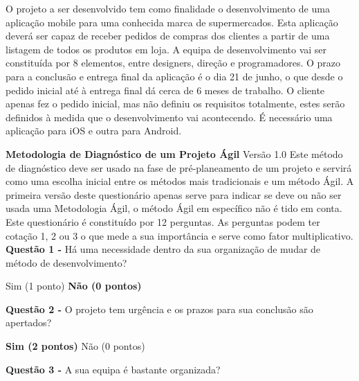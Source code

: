 O projeto a ser desenvolvido tem como finalidade o desenvolvimento de uma aplicação mobile para uma conhecida marca de supermercados. Esta aplicação deverá ser capaz de receber pedidos de compras dos clientes a partir de uma listagem de todos os produtos em loja. A  equipa de desenvolvimento vai ser constituída por 8 elementos, entre designers, direção e programadores. O prazo para a conclusão e entrega final da aplicação é o dia 21 de junho, o que desde o pedido inicial até à entrega final dá cerca de 6 meses de trabalho. O cliente apenas fez o pedido inicial, mas não definiu os requisitos totalmente, estes serão definidos à medida que o desenvolvimento vai acontecendo. É necessário uma aplicação para iOS e outra para Android.

\begin{framed}
\noindent\textbf{Metodologia de Diagnóstico de um Projeto Ágil}
\qquad
Versão 1.0
\vspace{2mm}
\newline Este método de diagnóstico deve ser usado na fase de pré-planeamento de um projeto e servirá como uma escolha inicial entre os métodos mais tradicionais e um método Ágil. A primeira versão deste questionário apenas serve para indicar se deve ou não ser usada uma Metodologia Ágil, o método Ágil em específico não é tido em conta.
\vspace{1mm}
\newline Este questionário é constituído por 12 perguntas. As perguntas podem ter cotação 1, 2 ou 3 o que mede a sua importância e serve como fator multiplicativo.
\vspace{5mm}
\newline\textbf{Questão 1 - } Há uma necessidade dentro da sua organização de mudar de método de desenvolvimento?
\newline \begin{center} Sim (1 ponto) \hspace{30mm} \textbf{Não (0 pontos)}\end{center}
\vspace{2mm}
\newline\textbf{Questão 2 - } O projeto tem urgência e os prazos para sua conclusão são apertados?
\newline \begin{center} \textbf{Sim (2 pontos)} \hspace{30mm} Não (0 pontos)\end{center}
\vspace{2mm}
\newline\textbf{Questão 3 - } A sua equipa é bastante organizada?

\end{framed}

